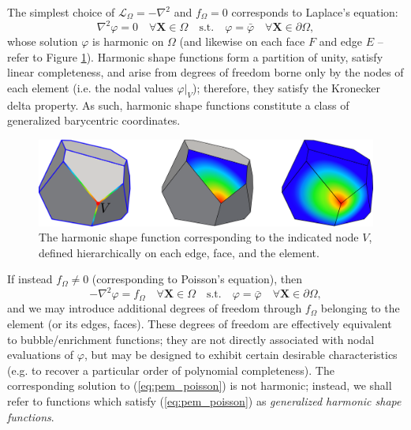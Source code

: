 	The simplest choice of $\mathcal{L}_{\Omega} = -\nabla^2$ and $f_{\Omega} = 0$ corresponds to Laplace's equation:
	\begin{equation}
		\nabla^2 \varphi = 0 \quad \forall \bm{X} \in \Omega \quad \text{s.t.} \quad \varphi = \bar{\varphi} \quad \forall \bm{X} \in \partial \Omega,
		\label{eq:pem_laplace}
	\end{equation}
	whose solution $\varphi$ is harmonic on $\Omega$ (and likewise on each face $F$ and edge $E$ -- refer to Figure \ref{fig:harmonic_sfs}). Harmonic shape functions form a partition of unity, satisfy linear completeness, and arise from degrees of freedom borne only by the nodes of each element (i.e. the nodal values $\varphi|_V$); therefore, they satisfy the Kronecker delta property. As such, harmonic shape functions constitute a class of generalized barycentric coordinates.
	
\begin{figure} [!ht]
	\centering
	\includegraphics[width = 6.0in]{figures/harmonic_sfs.pdf}
	\caption{The harmonic shape function corresponding to the indicated node $V$, defined hierarchically on each edge, face, and the element.}
	\label{fig:harmonic_sfs}
\end{figure}
	
	If instead $f_{\Omega} \neq 0$ (corresponding to Poisson's equation), then
	\begin{equation}
		-\nabla^2 \varphi = f_{\Omega} \quad \forall \bm{X} \in \Omega \quad \text{s.t.} \quad \varphi = \bar{\varphi} \quad \forall \bm{X} \in \partial \Omega,
		\label{eq:pem_poisson}
	\end{equation}
	and we may introduce additional degrees of freedom through $f_{\Omega}$ belonging to the element (or its edges, faces). These degrees of freedom are effectively equivalent to bubble/enrichment functions; they are not directly associated with nodal evaluations of $\varphi$, but may be designed to exhibit certain desirable characteristics (e.g. to recover a particular order of polynomial completeness). The corresponding solution to (\ref{eq:pem_poisson}) is not harmonic; instead, we shall refer to functions which satisfy (\ref{eq:pem_poisson}) as \textit{generalized harmonic shape functions}.
	
